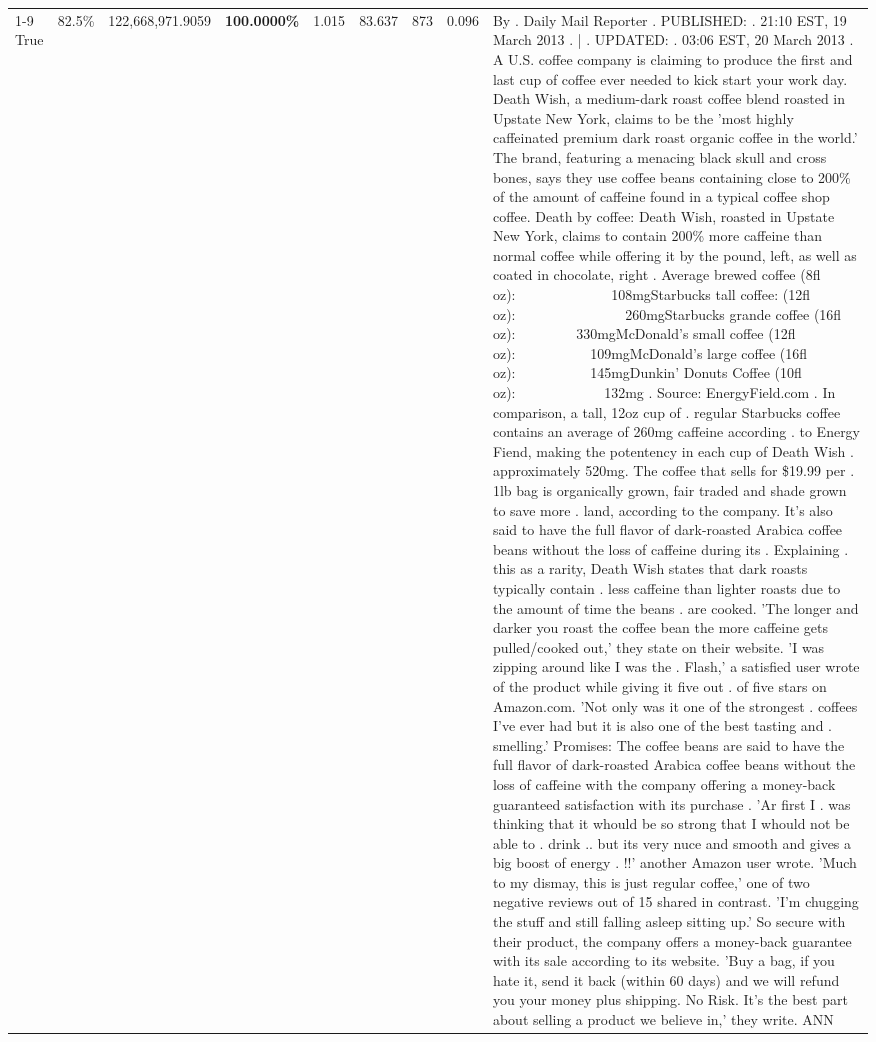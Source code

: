 \begin{table}[H]
{\begin{tabular}{lllrlllll}
\cline{1-9} \cline{2-9}
True & 82.5\% & 122,668,971.9059 & \bfseries \color{red} 100.0000\% & 1.015 & 83.637 & 873 & 0.096 & By . Daily Mail Reporter . PUBLISHED: . 21:10 EST, 19 March 2013 . | . UPDATED: . 03:06 EST, 20 March 2013 . A U.S. coffee company is claiming to produce the first and last cup of coffee ever needed to kick start your work day. Death Wish, a medium-dark roast coffee blend roasted in Upstate New York, claims to be the 'most highly caffeinated premium dark roast organic coffee in the world.' The brand, featuring a menacing black skull and cross bones, says they use coffee beans containing close to 200\% of the amount of caffeine found in a typical coffee shop coffee. Death by coffee: Death Wish, roasted in Upstate New York, claims to contain 200\% more caffeine than normal coffee while offering it by the pound, left, as well as coated in chocolate, right . Average brewed coffee (8fl oz):              108mgStarbucks tall coffee: (12fl oz):                260mgStarbucks grande coffee (16fl oz):         330mgMcDonald's small coffee (12fl oz):           109mgMcDonald's large coffee (16fl oz):           145mgDunkin' Donuts Coffee (10fl oz):             132mg . Source: EnergyField.com . In comparison, a tall, 12oz cup of . regular Starbucks coffee contains an average of 260mg caffeine according . to Energy Fiend, making the potentency in each cup of Death Wish . approximately 520mg. The coffee that sells for \$19.99 per . 1lb bag is organically grown, fair traded and shade grown to save more . land, according to the company. It's also said to have the full flavor of dark-roasted Arabica coffee beans without the loss of caffeine during its . Explaining . this as a rarity, Death Wish states that dark roasts typically contain . less caffeine than lighter roasts due to the amount of time the beans . are cooked. 'The longer and darker you roast the coffee bean the more caffeine gets pulled/cooked out,' they state on their website. 'I was zipping around like I was the . Flash,' a satisfied user wrote of the product while giving it five out . of five stars on Amazon.com. 'Not only was it one of the strongest . coffees I've ever had but it is also one of the best tasting and . smelling.’ Promises: The coffee beans are said to have the full flavor of dark-roasted Arabica coffee beans without the loss of caffeine with the company offering a money-back guaranteed satisfaction with its purchase . 'Ar first I . was thinking that it whould be so strong that I whould not be able to . drink .. but its very nuce and smooth and gives a big boost of energy . !!' another Amazon user wrote. 'Much to my dismay, this is just regular coffee,' one of two negative reviews out of 15 shared in contrast. 'I'm chugging the stuff and still falling asleep sitting up.' So secure with their product, the company offers a money-back guarantee with its sale according to its website. 'Buy a bag, if you hate it, send it back (within 60 days) and we will refund you your money plus shipping. No Risk. It’s the best part about selling a product we believe in,' they write. ANN \\

\end{tabular}}
\end{table}
